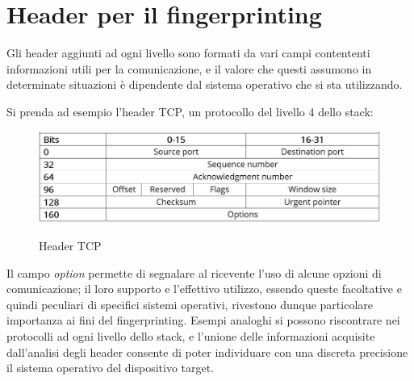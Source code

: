 \section{Header per il fingerprinting}
Gli header aggiunti ad ogni livello sono formati da vari campi contententi informazioni utili per la comunicazione, e il valore che questi assumono in determinate situazioni è dipendente dal sistema operativo che si sta utilizzando.

Si prenda ad esempio l'header TCP, un protocollo del livello 4 dello stack:\\

\begin{figure}[H]
	\centering
	\includegraphics[width=\textwidth]{figures/headerTCP.JPG}
	\caption{Header TCP}
	\label{headerTCP}
	\cite{headerTCP}
\end{figure}

Il campo \textit{option} permette di segnalare al ricevente l'uso di alcune opzioni di comunicazione; il loro supporto e l'effettivo utilizzo, essendo queste facoltative e quindi peculiari di specifici sistemi operativi, rivestono dunque particolare importanza ai fini del fingerprinting.
Esempi analoghi si possono riscontrare nei protocolli ad ogni livello dello stack, e l'unione delle informazioni acquisite dall'analisi degli header consente di poter individuare con una discreta precisione il sistema operativo del dispositivo target.
